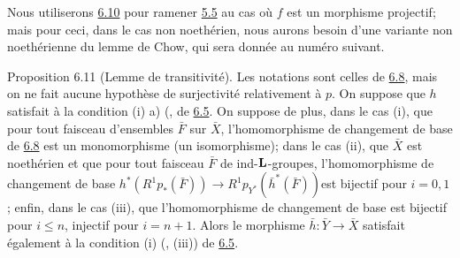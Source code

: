 \documentclass[10pt]{../fichiers-configuration-latex/smfart}
\begin{document}
Nous utiliserons \hyperref[XII.cor6.10]{6.10} pour ramener \hyperref[XII.cor5.5]{5.5} 
au cas où $f$ est un morphisme
projectif; mais pour ceci, dans le cas non noethérien, nous aurons
besoin d'une variante non noethérienne du lemme de Chow, qui sera
donnée au numéro suivant.

\begin{enonce*}{Proposition 6.11}
(Lemme de transitivité). Les notations sont celles de \hyperref[XII.prop6.8]{6.8}, mais on
ne fait aucune hypothèse de surjectivité relativement à $p$. On
suppose que $h$ satisfait à la condition {\rm (i) a)} (,  de \hyperref[XII.prop6.5]{6.5}. On suppose de plus, dans le cas
{\rm(i)}, que pour tout faisceau d'ensembles $\bar{F}$ sur $\bar{X}$,
l'homomorphisme de changement de base de \hyperref[XII.prop6.8]{6.8} est un monomorphisme
(\resp un isomorphisme); dans le cas {\rm(ii)}, que $\bar{X}$ est
noethérien et que pour tout faisceau $\bar{F}$ de
ind-$\mathbf{L}$-groupes, l'homomorphisme de changement de base
$h^{\ast}(R^1p_{\ast}(\bar{F}))\rightarrow
R^1p_{Y^{\ast}}(\bar{h}^{\ast}(\bar{F}))$\pageoriginale est bijectif
pour $i=0,1$; enfin, dans le cas {\rm(iii)}, que l'homomorphisme de
changement de base est bijectif pour $i\leq n$, injectif pour
$i=n+1$. Alors le morphisme $\bar{h}:\bar{Y}\rightarrow \bar{X}$
satisfait également à la condition {\rm(i)} (, \resp
{\rm(iii)}) de \hyperref[XII.prop6.5]{6.5}.
\end{enonce*}
\end{document}
